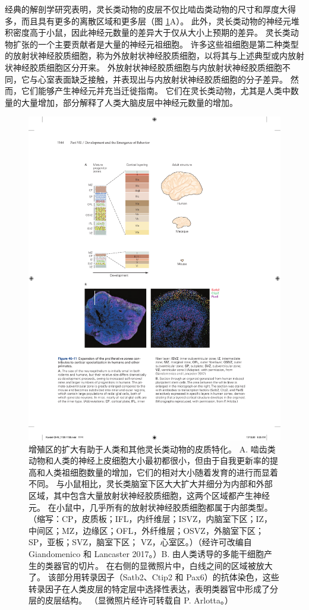 经典的解剖学研究表明，灵长类动物的皮层不仅比啮齿类动物的尺寸和厚度大得多，而且具有更多的离散区域和更多层（图 \ref{fig:46_11}A）。 
此外，灵长类动物的神经元堆积密度高于小鼠，因此神经元数量的差异大于仅从大小上预期的差异。 灵长类动物扩张的一个主要贡献者是大量的神经元祖细胞。 许多这些祖细胞是第二种类型的放射状神经胶质细胞，称为外放射状神经胶质细胞，以将其与上述典型或内放射状神经胶质细胞区分开来。 外放射状神经胶质细胞与内放射状神经胶质细胞不同，它与心室表面缺乏接触，并表现出与内放射状神经胶质细胞的分子差异。 然而，它们能够产生神经元并充当迁徙指南。 它们在灵长类动物，尤其是人类中数量的大量增加，部分解释了人类大脑皮层中神经元数量的增加。

\begin{figure}[htbp]
	\centering
	\includegraphics[width=0.7\linewidth]{chap46/fig_46_11}
	\caption{增殖区的扩大有助于人类和其他灵长类动物的皮质特化。 A. 啮齿类动物和人类的神经上皮细胞大小最初都很小，但由于自我更新率的提高和人类祖细胞数量的增加，它们的相对大小随着发育的进行而显着不同。 与小鼠相比，灵长类脑室下区大大扩大并细分为内部和外部区域，其中包含大量放射状神经胶质细胞，这两个区域都产生神经元。 在小鼠中，几乎所有的放射状神经胶质细胞都属于内部类型。 （缩写：CP，皮质板；IFL，内纤维层；ISVZ，内脑室下区；IZ，中间区；MZ，边缘区；OFL，外纤维层；OSVZ，外脑室下区；SP，亚板；SVZ，脑室下区； VZ，心室区。）（经许可改编自 Giandomenico 和 Lancaster 2017。）B. 由人类诱导的多能干细胞产生的类器官的切片。 在右侧的显微照片中，白线之间的区域被放大了。 该部分用转录因子（Satb2、Ctip2 和 Pax6）的抗体染色，这些转录因子在人类皮层的特定层中选择性表达，表明类器官中形成了分层的皮层结构。 （显微照片经许可转载自 P. Arlotta。）}
	\label{fig:46_11}
\end{figure}

